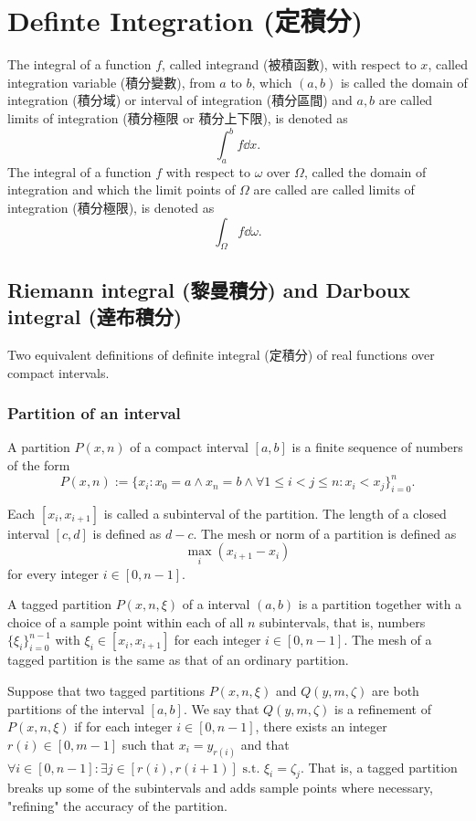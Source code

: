 \documentclass[a4paper,12pt]{report}
\begin{document}
\section{Definte Integration (定積分)}
The integral of a function $f$, called integrand (被積函數), with respect to $x$, called integration variable (積分變數), from $a$ to $b$, which $(a,b)$ is called the domain of integration (積分域) or interval of integration (積分區間) and $a,b$ are called limits of integration (積分極限 or 積分上下限), is denoted as
\[\int_a^bf\dd{x}.\]
The integral of a function $f$ with respect to $\omega$ over $\Omega$, called the domain of integration and which the limit points of $\Omega$ are called are called limits of integration (積分極限), is denoted as
\[\int_{\Omega}f\dd{\omega}.\]
\subsection{Riemann integral (黎曼積分) and Darboux integral (達布積分)}
Two equivalent definitions of definite integral (定積分) of real functions over compact intervals.
\subsubsection{Partition of an interval}
A partition $P(x, n)$ of a compact interval $[a,b]$ is a finite sequence of numbers of the form
\[P(x, n):=\{x_i\colon x_0=a\land x_n=b\land\forall 1\leq i<j\leq n\colon x_i<x_j\}_{i=0}^n.\]

Each $[x_i, x_{i+1}]$ is called a subinterval of the partition. The length of a closed interval $[c,d]$ is defined as $d-c$. The mesh or norm of a partition is defined as
\[\max_i\left(x_{i+1}-x_{i}\right)\]
for every integer $i\in [0,n-1]$.

A tagged partition $P(x,n,\xi)$ of a interval $(a,b)$ is a partition together with a choice of a sample point within each of all $n$ subintervals, that is, numbers $\{\xi_i\}_{i=0}^{n-1}$ with $\xi_i\in [x_i,x_{i+1}]$ for each integer $i\in [0,n-1]$. The mesh of a tagged partition is the same as that of an ordinary partition.

Suppose that two tagged partitions $P(x,n,\xi)$ and $Q(y,m,\zeta)$ are both partitions of the interval $[a,b]$. We say that $Q(y,m,\zeta)$ is a refinement of $P(x,n,\xi)$ if for each integer $i\in [0,n-1]$, there exists an integer $r(i)\in [0,m-1]$ such that $x_i = y_{r(i)}$ and that $\forall i\in [0,n-1]\colon\exists j\in [r(i),r(i + 1)] \text{\ s.t.\ }\xi_i = \zeta_j$. That is, a tagged partition breaks up some of the subintervals and adds sample points where necessary, "refining" the accuracy of the partition.
\end{document}
